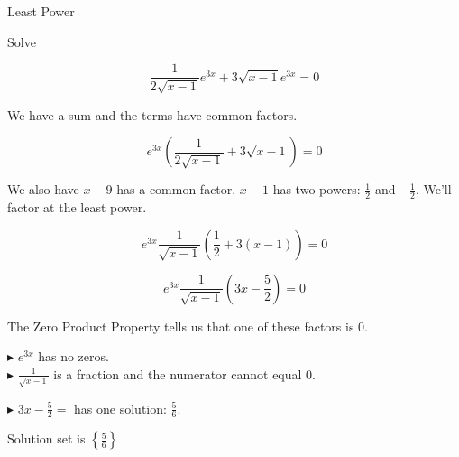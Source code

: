 \documentclass{ximera}
\begin{document}
\begin{example} Least Power



Solve 


\[  \frac{1}{2 \sqrt{x-1}} e^{3x}  + 3 \sqrt{x-1} e^{3x} = 0  \]


\begin{explanation} 

We have a sum and the terms have common factors.



\[  e^{3x}  \left( \frac{1}{2 \sqrt{x-1}}  + 3 \sqrt{x-1}  \right) = 0  \]



We also have $x-9$ has a common factor.  $x-1$ has two powers: $\tfrac{1}{2}$ and $-\tfrac{1}{2}$.  We'll factor at the least power.


\[  e^{3x}  \frac{1}{\sqrt{x-1}}   \left( \frac{1}{2}  + 3 (x-1)  \right) = 0 \]

\[  e^{3x}  \frac{1}{\sqrt{x-1}}   \left( 3x - \frac{5}{2}  \right) = 0  \]





The Zero Product Property tells us that one of these factors is $0$.



$\blacktriangleright$   $e^{3x}$ has no zeros. \\


$\blacktriangleright$   $\frac{1}{\sqrt{x-1}}$ is a fraction and the numerator cannot equal $0$.


$\blacktriangleright$  $3x - \frac{5}{2} = $ has one solution:  $\frac{5}{6}$.



Solution set is $\left\{  \frac{5}{6} \right\}$

\end{explanation}
\end{example}
\end{document}
